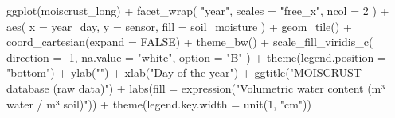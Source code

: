 \documentclass[
  table]{article}
\newenvironment{Shaded}{\begin{snugshade}}{\end{snugshade}}
\newcommand{\AttributeTok}[1]{\textcolor[rgb]{0.77,0.63,0.00}{#1}}
\newcommand{\ConstantTok}[1]{\textcolor[rgb]{0.00,0.00,0.00}{#1}}
\newcommand{\DecValTok}[1]{\textcolor[rgb]{0.00,0.00,0.81}{#1}}
\newcommand{\FunctionTok}[1]{\textcolor[rgb]{0.00,0.00,0.00}{#1}}
\newcommand{\NormalTok}[1]{#1}
\newcommand{\SpecialCharTok}[1]{\textcolor[rgb]{0.00,0.00,0.00}{#1}}
\newcommand{\StringTok}[1]{\textcolor[rgb]{0.31,0.60,0.02}{#1}}
\begin{document}
\begin{Shaded}
\begin{Highlighting}[]
\FunctionTok{ggplot}\NormalTok{(moiscrust\_long) }\SpecialCharTok{+} 
  \FunctionTok{facet\_wrap}\NormalTok{(}
    \StringTok{"year"}\NormalTok{, }
    \AttributeTok{scales =} \StringTok{"free\_x"}\NormalTok{, }
    \AttributeTok{ncol =} \DecValTok{2}
\NormalTok{    ) }\SpecialCharTok{+}
  \FunctionTok{aes}\NormalTok{(}
    \AttributeTok{x =}\NormalTok{ year\_day, }
    \AttributeTok{y =}\NormalTok{ sensor, }
    \AttributeTok{fill =}\NormalTok{ soil\_moisture}
\NormalTok{    ) }\SpecialCharTok{+} 
  \FunctionTok{geom\_tile}\NormalTok{() }\SpecialCharTok{+} 
  \FunctionTok{coord\_cartesian}\NormalTok{(}\AttributeTok{expand =} \ConstantTok{FALSE}\NormalTok{) }\SpecialCharTok{+}
  \FunctionTok{theme\_bw}\NormalTok{() }\SpecialCharTok{+} 
  \FunctionTok{scale\_fill\_viridis\_c}\NormalTok{(}
    \AttributeTok{direction =} \SpecialCharTok{{-}}\DecValTok{1}\NormalTok{, }
    \AttributeTok{na.value =} \StringTok{"white"}\NormalTok{, }
    \AttributeTok{option =} \StringTok{"B"}
\NormalTok{    ) }\SpecialCharTok{+} 
  \FunctionTok{theme}\NormalTok{(}\AttributeTok{legend.position =} \StringTok{"bottom"}\NormalTok{) }\SpecialCharTok{+} 
  \FunctionTok{ylab}\NormalTok{(}\StringTok{""}\NormalTok{) }\SpecialCharTok{+} 
  \FunctionTok{xlab}\NormalTok{(}\StringTok{"Day of the year"}\NormalTok{) }\SpecialCharTok{+}
  \FunctionTok{ggtitle}\NormalTok{(}\StringTok{"MOISCRUST database (raw data)"}\NormalTok{) }\SpecialCharTok{+}
  \FunctionTok{labs}\NormalTok{(}\AttributeTok{fill =} \FunctionTok{expression}\NormalTok{(}\StringTok{"Volumetric water content (m³ water / m³ soil)"}\NormalTok{)) }\SpecialCharTok{+} 
  \FunctionTok{theme}\NormalTok{(}\AttributeTok{legend.key.width =} \FunctionTok{unit}\NormalTok{(}\DecValTok{1}\NormalTok{, }\StringTok{"cm"}\NormalTok{))}
\end{Highlighting}
\end{Shaded}
\end{document}
